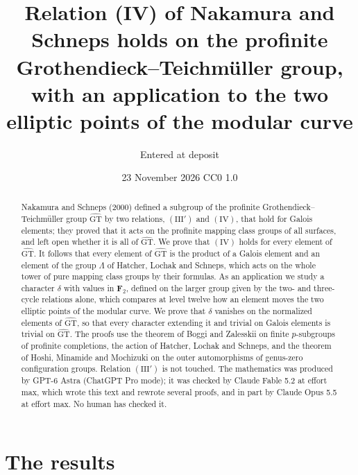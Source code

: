 \documentclass[11pt,a4paper]{article}
\title{Relation (IV) of Nakamura and Schneps holds on the profinite Grothendieck--Teichm\"uller group,
with an application to the two elliptic points of the modular curve}
\author{Entered at deposit}
\date{23 November 2026 \quad CC0 1.0}
\theoremstyle{plain}
\theoremstyle{definition}
\theoremstyle{remark}
\newcommand{\GT}{\widehat{\mathrm{GT}}}
\begin{document}
\maketitle

\begin{abstract}
\noindent
Nakamura and Schneps (2000) defined a subgroup of the profinite Grothendieck--Teichm\"uller group $\GT$ by two
relations, $(\mathrm{III}')$ and $(\mathrm{IV})$, that hold for Galois elements; they proved that it acts on the
profinite mapping class groups of all surfaces, and left open whether it is all of $\GT$. We prove that
$(\mathrm{IV})$ holds for every element of $\GT$. It follows that every element of $\GT$ is the product of a Galois
element and an element of the group $\Lambda$ of Hatcher, Lochak and Schneps, which acts on the whole tower of pure
mapping class groups by their formulas. As an application we study a character $\delta$ with values in
$\mathbf F_2$, defined on the larger group given by the two- and three-cycle relations alone, which compares at
level twelve how an element moves the two elliptic points of the modular curve. We prove that $\delta$ vanishes on
the normalized elements of $\GT$, so that every character extending it and trivial on Galois elements is trivial on
$\GT$. The proofs use the theorem of Boggi and Zalesskii on finite $p$-subgroups of profinite completions, the
action of Hatcher, Lochak and Schneps, and the theorem of Hoshi, Minamide and Mochizuki on the outer automorphisms
of genus-zero configuration groups. Relation $(\mathrm{III}')$ is not touched. The mathematics was produced by
GPT-6 Astra (ChatGPT Pro mode); it was checked by Claude Fable 5.2 at effort max, which wrote this text and rewrote
several proofs, and in part by Claude Opus 5.5 at effort max. No human has checked it.
\end{abstract}

\section{The results}
\end{document}
